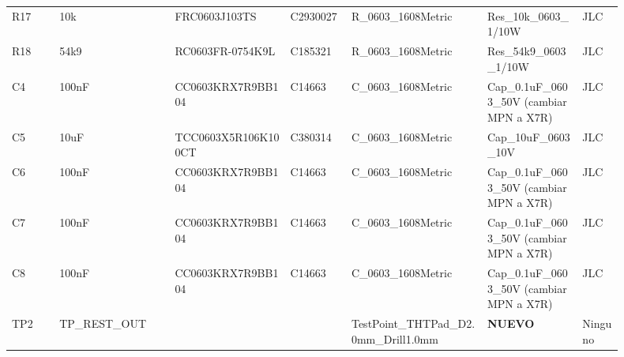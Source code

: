 \documentclass[10pt,a4paper]{article}
\begin{document}
{\begin{longtable}{@{}L{0.07\linewidth}L{0.17\linewidth}L{0.17\linewidth}L{0.09\linewidth}L{0.20\linewidth}L{0.14\linewidth}L{0.06\linewidth}@{}}
R17 & 10k & FRC0603J103TS & C2930027 & R\_\allowbreak{}0603\_\allowbreak{}1608Metric & Res\_\allowbreak{}10k\_\allowbreak{}0603\_\allowbreak{}1/10W & JLC\\
R18 & 54k9 & RC0603FR-0754K9L & C185321 & R\_\allowbreak{}0603\_\allowbreak{}1608Metric & Res\_\allowbreak{}54k9\_\allowbreak{}0603\_\allowbreak{}1/10W & JLC\\
C4 & 100nF & CC0603KRX7R9BB104 & C14663 & C\_\allowbreak{}0603\_\allowbreak{}1608Metric & Cap\_\allowbreak{}0.1uF\_\allowbreak{}0603\_\allowbreak{}50V (cambiar MPN a X7R) & JLC\\
C5 & 10uF & TCC0603X5R106K100CT & C380314 & C\_\allowbreak{}0603\_\allowbreak{}1608Metric & Cap\_\allowbreak{}10uF\_\allowbreak{}0603\_\allowbreak{}10V & JLC\\
C6 & 100nF & CC0603KRX7R9BB104 & C14663 & C\_\allowbreak{}0603\_\allowbreak{}1608Metric & Cap\_\allowbreak{}0.1uF\_\allowbreak{}0603\_\allowbreak{}50V (cambiar MPN a X7R) & JLC\\
C7 & 100nF & CC0603KRX7R9BB104 & C14663 & C\_\allowbreak{}0603\_\allowbreak{}1608Metric & Cap\_\allowbreak{}0.1uF\_\allowbreak{}0603\_\allowbreak{}50V (cambiar MPN a X7R) & JLC\\
C8 & 100nF & CC0603KRX7R9BB104 & C14663 & C\_\allowbreak{}0603\_\allowbreak{}1608Metric & Cap\_\allowbreak{}0.1uF\_\allowbreak{}0603\_\allowbreak{}50V (cambiar MPN a X7R) & JLC\\
TP2 & TP\_\allowbreak{}REST\_\allowbreak{}OUT &  &  & TestPoint\_\allowbreak{}THTPad\_\allowbreak{}D2.0mm\_\allowbreak{}Drill1.0mm & \textbf{NUEVO} & Ninguno\\
\bottomrule\end{longtable}}
\end{document}
